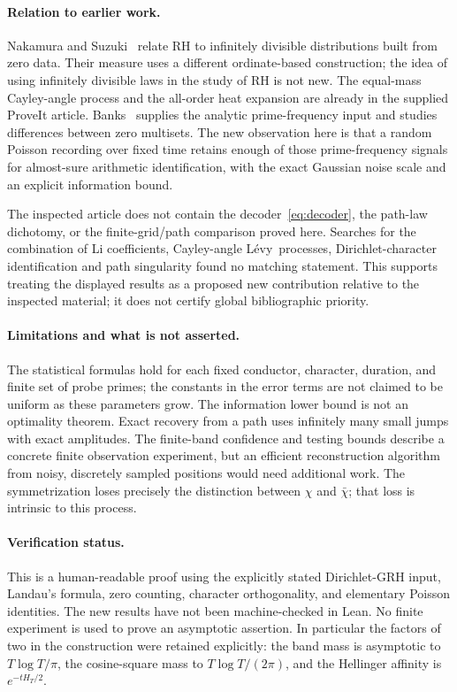 \documentclass[11pt]{article}
\theoremstyle{definition}
\newcommand{\Levy}{L\'evy}
\begin{document}
\paragraph{Relation to earlier work.}
Nakamura and Suzuki~\cite{NakamuraSuzuki} relate RH to infinitely divisible
distributions built from zero data. Their measure uses a different
ordinate-based construction; the idea of using infinitely divisible laws in
the study of RH is not new. The equal-mass Cayley-angle process and the
all-order heat expansion are already in the supplied ProveIt article.
Banks~\cite{Banks} supplies the analytic prime-frequency input and studies
differences between zero multisets. The new observation here is that a random
Poisson recording over fixed time retains enough of those prime-frequency
signals for almost-sure arithmetic identification, with the exact Gaussian
noise scale and an explicit information bound.

The inspected article does not contain the decoder~\eqref{eq:decoder}, the
path-law dichotomy, or the finite-grid/path comparison proved here. Searches
for the combination of Li coefficients, Cayley-angle \Levy\ processes,
Dirichlet-character identification and path singularity found no matching
statement. This supports treating the displayed results as a proposed new
contribution relative to the inspected material; it does not certify global
bibliographic priority.

\paragraph{Limitations and what is not asserted.}
The statistical formulas hold for each fixed conductor, character, duration,
and finite set of probe primes; the constants in the error terms are not
claimed to be uniform as these parameters grow. The information lower bound
is not an optimality theorem. Exact recovery from a path uses infinitely many
small jumps with exact amplitudes. The finite-band confidence and testing
bounds describe a concrete finite observation experiment, but an efficient
reconstruction algorithm from noisy, discretely sampled positions would need
additional work. The symmetrization loses precisely the distinction between
$\chi$ and $\bar\chi$; that loss is intrinsic to this process.

\paragraph{Verification status.}
This is a human-readable proof using the explicitly stated Dirichlet-GRH
input, Landau's formula, zero counting, character orthogonality, and elementary
Poisson identities. The new results have not been machine-checked in Lean.
No finite experiment is used to prove an asymptotic assertion. In particular
the factors of two in the construction were retained explicitly: the band
mass is asymptotic to $T\log T/\pi$, the cosine-square mass to
$T\log T/(2\pi)$, and the Hellinger affinity is $e^{-tH_T/2}$.
\end{document}
